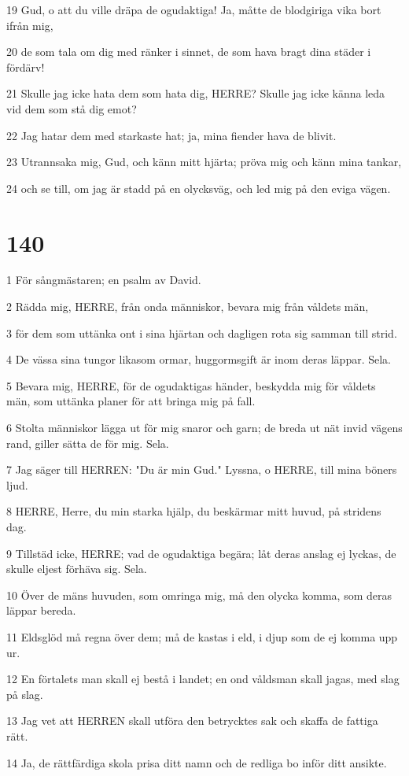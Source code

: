 \par 19 Gud, o att du ville dräpa de ogudaktiga! Ja, måtte de blodgiriga vika bort ifrån mig,
\par 20 de som tala om dig med ränker i sinnet, de som hava bragt dina städer i fördärv!
\par 21 Skulle jag icke hata dem som hata dig, HERRE? Skulle jag icke känna leda vid dem som stå dig emot?
\par 22 Jag hatar dem med starkaste hat; ja, mina fiender hava de blivit.
\par 23 Utrannsaka mig, Gud, och känn mitt hjärta; pröva mig och känn mina tankar,
\par 24 och se till, om jag är stadd på en olycksväg, och led mig på den eviga vägen.

\chapter{140}

\par 1 För sångmästaren; en psalm av David.
\par 2 Rädda mig, HERRE, från onda människor, bevara mig från våldets män,
\par 3 för dem som uttänka ont i sina hjärtan och dagligen rota sig samman till strid.
\par 4 De vässa sina tungor likasom ormar, huggormsgift är inom deras läppar. Sela.
\par 5 Bevara mig, HERRE, för de ogudaktigas händer, beskydda mig för våldets män, som uttänka planer för att bringa mig på fall.
\par 6 Stolta människor lägga ut för mig snaror och garn; de breda ut nät invid vägens rand, giller sätta de för mig. Sela.
\par 7 Jag säger till HERREN: "Du är min Gud." Lyssna, o HERRE, till mina böners ljud.
\par 8 HERRE, Herre, du min starka hjälp, du beskärmar mitt huvud, på stridens dag.
\par 9 Tillstäd icke, HERRE; vad de ogudaktiga begära; låt deras anslag ej lyckas, de skulle eljest förhäva sig. Sela.
\par 10 Över de mäns huvuden, som omringa mig, må den olycka komma, som deras läppar bereda.
\par 11 Eldsglöd må regna över dem; må de kastas i eld, i djup som de ej komma upp ur.
\par 12 En förtalets man skall ej bestå i landet; en ond våldsman skall jagas, med slag på slag.
\par 13 Jag vet att HERREN skall utföra den betrycktes sak och skaffa de fattiga rätt.
\par 14 Ja, de rättfärdiga skola prisa ditt namn och de redliga bo inför ditt ansikte.

